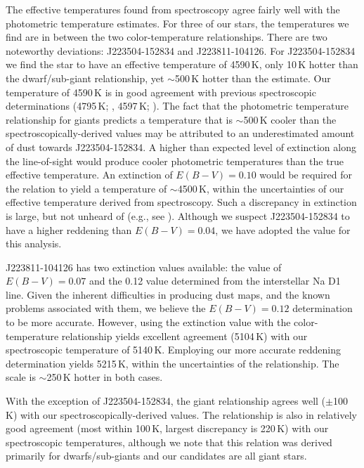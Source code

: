 \documentclass{emulateapj}
\begin{document}
The effective temperatures found from spectroscopy agree fairly well with the photometric temperature estimates. For three of our stars, the temperatures we find are in between the two color-temperature relationships. There are two noteworthy deviations: J223504-152834 and J223811-104126. For J223504-152834 we find the star to have an effective temperature of 4590\,K, only 10\,K hotter than the \citet{casagrande;et-al_2010} dwarf/sub-giant relationship, yet ${\sim}$500\,K hotter than the \citet{alonso;et-al_1999} estimate. Our temperature of 4590\,K is in good agreement with previous spectroscopic determinations (4795\,K; \citet{williams;et-al_2011}, 4597\,K; \citet{wylie-de-boer;et-al_2012}). The fact that the \citet{alonso;et-al_1999} photometric temperature relationship for giants predicts a temperature that is ${\sim}$500\,K cooler than the spectroscopically-derived values may be attributed to an underestimated amount of dust towards J223504-152834. A higher than expected level of extinction along the line-of-sight would produce cooler photometric temperatures than the true effective temperature.  An extinction of $E(B-V) = 0.10$ would be required for the \citet{alonso;et-al_1999} relation to yield a temperature of ${\sim}$4500\,K, within the uncertainties of our effective temperature derived from spectroscopy. Such a discrepancy in extinction is large, but not unheard of (e.g., see \citet{nataf;et-al}). Although we suspect J223504-152834 to have a higher reddening than $E(B-V) = 0.04$, we have adopted the \citet{schlegel;et-al_1998} value for this analysis.

J223811-104126 has two extinction values available: the \citet{schlegel;et-al_1998} value of $E(B-V) = 0.07$ and the 0.12 value  determined from the interstellar Na D1 line. Given the inherent difficulties in producing dust maps, and the known problems associated with them, we believe the $E(B-V) = 0.12$ determination to be more accurate. However, using the \citet{schlegel;et-al_1998} extinction value with the \citet{alonso;et-al_1999} color-temperature relationship yields excellent agreement (5104\,K) with our spectroscopic temperature of 5140\,K. Employing our more accurate reddening determination yields 5215\,K, within the uncertainties of the relationship. The \citet{casagrande;et-al_2010} scale is ${\sim}$250\,K hotter in both cases.

With the exception of J223504-152834, the \citet{alonso;et-al_1999} giant relationship agrees well ($\pm$100\,K) with our spectroscopically-derived values. The \citet{casagrande;et-al_2010} relationship is also in relatively good agreement (most within 100\,K, largest discrepancy is 220\,K) with our spectroscopic temperatures, although we note that this relation was derived primarily for dwarfs/sub-giants and our candidates are all giant stars.
\end{document}
